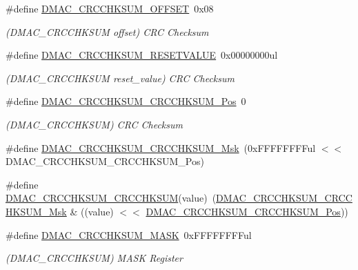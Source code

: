 \begin{DoxyCompactItemize}
\#define \mbox{\hyperlink{group___s_a_m_d21___d_m_a_c_gaaf28d2e2f85065902296367f85cbf653}{D\+M\+A\+C\+\_\+\+C\+R\+C\+C\+H\+K\+S\+U\+M\+\_\+\+O\+F\+F\+S\+ET}}~0x08
\begin{DoxyCompactList}\small\item\em (D\+M\+A\+C\+\_\+\+C\+R\+C\+C\+H\+K\+S\+UM offset) C\+RC Checksum \end{DoxyCompactList}\item 
\#define \mbox{\hyperlink{group___s_a_m_d21___d_m_a_c_ga5a674aea99e5458c83f7d8c593158f57}{D\+M\+A\+C\+\_\+\+C\+R\+C\+C\+H\+K\+S\+U\+M\+\_\+\+R\+E\+S\+E\+T\+V\+A\+L\+UE}}~0x00000000ul
\begin{DoxyCompactList}\small\item\em (D\+M\+A\+C\+\_\+\+C\+R\+C\+C\+H\+K\+S\+UM reset\+\_\+value) C\+RC Checksum \end{DoxyCompactList}\item 
\#define \mbox{\hyperlink{group___s_a_m_d21___d_m_a_c_gae067bcd8b5d57e5e006ddd8d5bf1b619}{D\+M\+A\+C\+\_\+\+C\+R\+C\+C\+H\+K\+S\+U\+M\+\_\+\+C\+R\+C\+C\+H\+K\+S\+U\+M\+\_\+\+Pos}}~0
\begin{DoxyCompactList}\small\item\em (D\+M\+A\+C\+\_\+\+C\+R\+C\+C\+H\+K\+S\+UM) C\+RC Checksum \end{DoxyCompactList}\item 
\#define \mbox{\hyperlink{group___s_a_m_d21___d_m_a_c_ga8d05874fe6f2273d4e5cc5515a15586c}{D\+M\+A\+C\+\_\+\+C\+R\+C\+C\+H\+K\+S\+U\+M\+\_\+\+C\+R\+C\+C\+H\+K\+S\+U\+M\+\_\+\+Msk}}~(0x\+F\+F\+F\+F\+F\+F\+F\+Ful $<$$<$ D\+M\+A\+C\+\_\+\+C\+R\+C\+C\+H\+K\+S\+U\+M\+\_\+\+C\+R\+C\+C\+H\+K\+S\+U\+M\+\_\+\+Pos)
\item 
\#define \mbox{\hyperlink{group___s_a_m_d21___d_m_a_c_ga24abec4cc6540f28fd1370688bb384d0}{D\+M\+A\+C\+\_\+\+C\+R\+C\+C\+H\+K\+S\+U\+M\+\_\+\+C\+R\+C\+C\+H\+K\+S\+UM}}(value)~(\mbox{\hyperlink{group___s_a_m_d21___d_m_a_c_ga8d05874fe6f2273d4e5cc5515a15586c}{D\+M\+A\+C\+\_\+\+C\+R\+C\+C\+H\+K\+S\+U\+M\+\_\+\+C\+R\+C\+C\+H\+K\+S\+U\+M\+\_\+\+Msk}} \& ((value) $<$$<$ \mbox{\hyperlink{group___s_a_m_d21___d_m_a_c_gae067bcd8b5d57e5e006ddd8d5bf1b619}{D\+M\+A\+C\+\_\+\+C\+R\+C\+C\+H\+K\+S\+U\+M\+\_\+\+C\+R\+C\+C\+H\+K\+S\+U\+M\+\_\+\+Pos}}))
\item 
\#define \mbox{\hyperlink{group___s_a_m_d21___d_m_a_c_ga7c0021ba861b04234cc713fb97d18d48}{D\+M\+A\+C\+\_\+\+C\+R\+C\+C\+H\+K\+S\+U\+M\+\_\+\+M\+A\+SK}}~0x\+F\+F\+F\+F\+F\+F\+F\+Ful
\begin{DoxyCompactList}\small\item\em (D\+M\+A\+C\+\_\+\+C\+R\+C\+C\+H\+K\+S\+UM) M\+A\+SK Register \end{DoxyCompactList}\item 

\end{DoxyCompactItemize}
